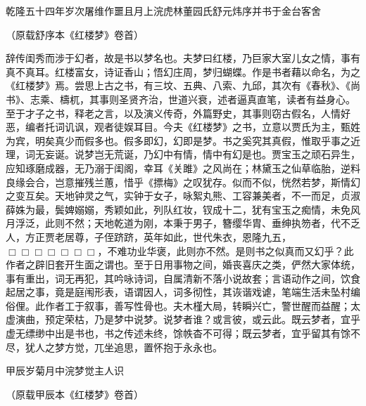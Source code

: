 \begin{flushright}
	乾隆五十四年岁次屠维作噩且月上浣虎林董园氏舒元炜序并书于金台客舍　　

{（原载舒序本《红楼梦》卷首）}　　
\end{flushright}

{}

辞传闺秀而涉于幻者，故是书以梦名也。夫梦曰红楼，乃巨家大室儿女之情，事有真不真耳。红楼富女，诗证香山；悟幻庄周，梦归蝴蝶。作是书者藉以命名，为之《红楼梦》焉。尝思上古之书，有三坟、五典、八索、九邱，其次有《春秋》、《尚书》、志乘、檮杌，其事则圣贤齐治，世道兴衰，述者逼真直笔，读者有益身心。至于才子之书，释老之言，以及演义传奇，外篇野史，其事则窃古假名，人情好恶，编者托词讥讽，观者徒娱耳目。今夫《红楼梦》之书，立意以贾氏为主，甄姓为宾，明矣真少而假多也。假多即幻，幻即是梦。书之奚究其真假，惟取乎事之近理，词无妄诞。说梦岂无荒诞，乃幻中有情，情中有幻是也。贾宝玉之顽石异生，应知琢磨成器，无乃溺于闺阁，幸耳《关雎》之风尚在；林黛玉之仙草临胎，逆料良缘会合，岂意摧残兰蕙，惜乎《摽梅》之叹犹存。似而不似，恍然若梦，斯情幻之变互矣。天地钟灵之气，实钟于女子，咏絮丸熊、工容兼美者，不一而足，贞淑薛姝为最，鬓婢嫋嫋，秀颖如此，列队红妆，钗成十二，犹有宝玉之痴情，未免风月浮泛，此则不然；天地乾道为刚，本秉于男子，簪缨华胄、垂绅执笏者，代不乏人，方正贾老居尊，子侄跻跻，英年如此，世代朱衣，恩隆九五，{$\Box\Box\Box\Box\Box\Box\Box$}，不难功业华褒，此则亦不然。是则书之似真而又幻乎？此作者之辟旧套开生面之谓也。至于日用事物之间，婚丧喜庆之类，俨然大家体统，事有重出，词无再犯，其吟咏诗词，自属清新不落小说故套；言语动作之间，饮食起居之事，竟是庭闱形表，语谓因人，词多彻性，其诙谐戏谑，笔端生活未坠村编俗俚。此作者工于叙事，善写性骨也。夫木槿大局，转瞬兴亡，警世醒而益醒；太虚演曲，预定荣枯，乃是梦中说梦。说梦者谁？或言彼，或云此。既云梦者，宜乎虚无缥缈中出是书也，书之传述未终，馀帙杳不可得；既云梦者，宜乎留其有馀不尽，犹人之梦方觉，兀坐追思，置怀抱于永永也。

\begin{flushright}
	甲辰岁菊月中浣梦觉主人识　　

{（原载甲辰本《红楼梦》卷首）}　　
\end{flushright}

